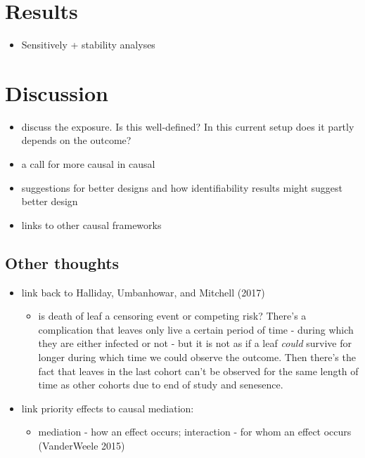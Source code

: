 \documentclass[]{article}
\providecommand{\tightlist}{%
  \setlength{\itemsep}{0pt}\setlength{\parskip}{0pt}}
\begin{document}
\hypertarget{results}{%
\section{Results}\label{results}}

\begin{itemize}
\tightlist
\item
  Sensitively + stability analyses
\end{itemize}

\hypertarget{discussion}{%
\section{Discussion}\label{discussion}}

\begin{itemize}
\tightlist
\item
  discuss the exposure. Is this well-defined? In this current setup does
  it partly depends on the outcome?
\item
  a call for more causal in causal
\item
  suggestions for better designs and how identifiability results might
  suggest better design
\item
  links to other causal frameworks
\end{itemize}

\hypertarget{other-thoughts}{%
\subsection{Other thoughts}\label{other-thoughts}}

\begin{itemize}
\tightlist
\item
  link back to Halliday, Umbanhowar, and Mitchell (2017)

  \begin{itemize}
  \tightlist
  \item
    is death of leaf a censoring event or competing risk? There's a
    complication that leaves only live a certain period of time - during
    which they are either infected or not - but it is not as if a leaf
    \emph{could} survive for longer during which time we could observe
    the outcome. Then there's the fact that leaves in the last cohort
    can't be observed for the same length of time as other cohorts due
    to end of study and senesence.
  \end{itemize}
\item
  link priority effects to causal mediation:

  \begin{itemize}
  \tightlist
  \item
    mediation - how an effect occurs; interaction - for whom an effect
    occurs (VanderWeele 2015)
  \end{itemize}
\end{itemize}
\end{document}
